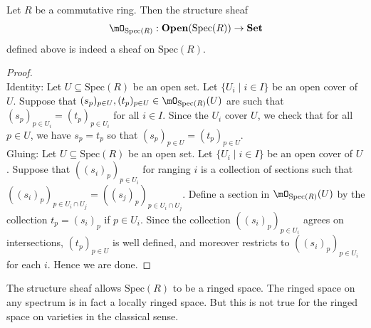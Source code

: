 \documentclass[a4paper]{article}
\begin{document}
\begin{prp}{}{}\\
Let $R$ be a commutative ring. Then the structure sheaf $$\mO_{\text{Spec}(R)}:\bold{Open}(\text{Spec}(R))\to\bold{Set}$$ defined above is indeed a sheaf on $\text{Spec}(R)$. 
\begin{proof}\\
Identity: Let $U\subseteq\text{Spec}(R)$ be an open set. Let $\{U_i\;|\;i\in I\}$ be an open cover of $U$. Suppose that $(s_p)_{p\in U},(t_p)_{p\in U}\in\mO_{\text{Spec}(R)}(U)$ are such that $(s_p)_{p\in U_i}=(t_p)_{p\in U_i}$ for all $i\in I$. Since the $U_i$ cover $U$, we check that for all $p\in U$, we have $s_p=t_p$ so that $(s_p)_{p\in U}=(t_p)_{p\in U}$. \\

Gluing: Let $U\subseteq\text{Spec}(R)$ be an open set. Let $\{U_i\;|\;i\in I\}$ be an open cover of $U$. Suppose that $((s_i)_p)_{p\in U_i}$ for ranging $i$ is a collection of sections such that $((s_i)_p)_{p\in U_i\cap U_j}=((s_j)_p)_{p\in U_i\cap U_j}$. Define a section in $\mO_{\text{Spec}(R)}(U)$ by the collection $t_p=(s_i)_p$ if $p\in U_i$. Since the collection $((s_i)_p)_{p\in U_i}$ agrees on intersections, $(t_p)_{p\in U}$ is well defined, and moreover restricts to $((s_i)_p)_{p\in U_i}$ for each $i$. Hence we are done.
\end{proof}
\end{prp}

The structure sheaf allows $\text{Spec}(R)$ to be a ringed space. The ringed space on any spectrum is in fact a locally ringed space. But this is not true for the ringed space on varieties in the classical sense. 
\end{document}
